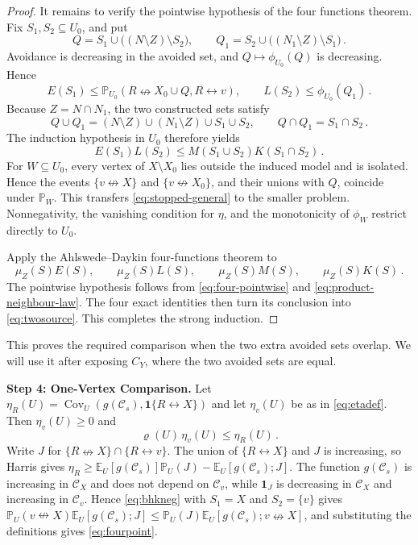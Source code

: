 \documentclass[11pt]{article}
\theoremstyle{definition}
\theoremstyle{remark}
\newcommand{\PP}{\mathbb P}
\newcommand{\EE}{\mathbb E}
\newcommand{\one}{\mathbf 1}
\newcommand{\con}{\leftrightarrow}
\newcommand{\ncon}{\nleftrightarrow}
\newcommand{\eC}{\mathcal C}
\DeclareMathOperator{\Cov}{Cov}
\begin{document}
\begin{proof}
It remains to verify the pointwise hypothesis of the four functions theorem. Fix
$S_1,S_2\subseteq U_0$, and put
\[
 Q=S_1\cup\bigl((N\setminus Z)\setminus S_2\bigr),\qquad
 Q_1=S_2\cup\bigl((N_1\setminus Z)\setminus S_1\bigr)\,.
\]
Avoidance is decreasing in the avoided set, and $Q\mapsto\phi_{U_0}(Q)$ is decreasing.
Hence
\[
 E(S_1)\leq\PP_{U_0}(R\ncon X_0\cup Q,R\con v),
 \qquad L(S_2)\leq\phi_{U_0}(Q_1)\,.
\]
Because $Z=N\cap N_1$, the two constructed sets satisfy
\[
 Q\cup Q_1=(N\setminus Z)\cup(N_1\setminus Z)\cup S_1\cup S_2,
 \qquad Q\cap Q_1=S_1\cap S_2\,.
\]
The induction hypothesis in $U_0$ therefore yields
\begin{equation}\label{eq:four-pointwise}
 E(S_1)L(S_2)\leq M(S_1\cup S_2)K(S_1\cap S_2)\,.
\end{equation}
For $W\subseteq U_0$, every vertex of $X\setminus X_0$ lies outside the induced model and
is isolated. Hence the events $\{v\ncon X\}$ and $\{v\ncon X_0\}$, and their unions with
$Q$, coincide under $\PP_W$. This transfers \eqref{eq:stopped-general} to the smaller
problem. Nonnegativity, the vanishing condition for $\eta$, and the monotonicity of
$\phi_W$ restrict directly to $U_0$.

Apply the Ahlswede--Daykin four-functions theorem to
\[
 \mu_Z(S)E(S),\qquad \mu_Z(S)L(S),\qquad
 \mu_Z(S)M(S),\qquad \mu_Z(S)K(S)\,.
\]
The pointwise hypothesis follows from \eqref{eq:four-pointwise} and
\eqref{eq:product-neighbour-law}. The four exact identities then turn its conclusion into
\eqref{eq:twosource}. This completes the strong induction.
\end{proof}

This proves the required comparison when the two extra avoided sets overlap. We will use
it after exposing $C_Y$, where the two avoided sets are equal.

\medskip\noindent\textbf{Step 4: One-Vertex Comparison.}
Let $\eta_R(U)=\Cov_U(g(\eC_s),\one\{R\con X\})$ and let $\eta_v(U)$ be as in
\eqref{eq:etadef}. Then $\eta_v(U)\ge0$ and
\begin{equation}\label{eq:fourpoint}
 \varrho(U)\,\eta_v(U)\leq \eta_R(U)\,.
\end{equation}
Write $J$ for $\{R\ncon X\}\cap\{R\con v\}$. The union of $\{R\con X\}$ and $J$ is
increasing, so Harris gives $\eta_R\ge\EE_U[g(\eC_s)]\PP_U(J)-\EE_U[g(\eC_s);J]$. The
function $g(\eC_s)$ is increasing in $\eC_X$ and does not depend on $\eC_v$, while $\one_J$
is decreasing in $\eC_X$ and increasing in $\eC_v$. Hence \eqref{eq:bhkneg} with $S_1=X$ and
$S_2=\{v\}$ gives $\PP_U(v\ncon X)\EE_U[g(\eC_s);J]\le\PP_U(J)\EE_U[g(\eC_s);v\ncon X]$,
and substituting the definitions gives \eqref{eq:fourpoint}.
\end{document}
